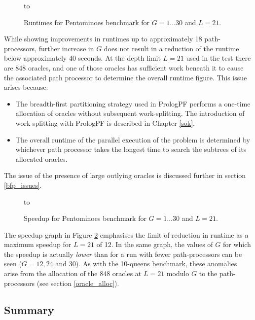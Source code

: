 \begin{figure}[htb]
\vspace{5mm} \hbox to 
\caption{Runtimes for Pentominoes benchmark for $G=1\ldots 30$ and $L=21$.}
\vspace{5mm}
\label{pentbook_cut_c_L_21}
\end{figure}

While showing improvements in runtimes up to approximately 18
path-processors, further increase in $G$ does not result in a
reduction of the runtime below approximately 40 seconds.  At the depth
limit $L=21$ used in the test there are 848 oracles, and one of those
oracles has sufficient work beneath it to cause the associated path
processor to determine the overall runtime figure.  This issue arises
because:
\begin{itemize}
\item{The breadth-first partitioning strategy used in PrologPF
  performs a one-time allocation of oracles without subsequent
  work-splitting.  The introduction of work-splitting with PrologPF
  is described in Chapter \ref{sok}.}
\item{The overall runtime of the parallel execution of the problem is determined by
  whichever path processor takes the longest time to search the subtrees of its
  allocated oracles.}
\end{itemize}
The issue of the presence of large outlying oracles
is discussed further in section \ref{bfp_issues}.

\begin{figure}[htb]
\vspace{5mm} \hbox to 
\caption{Speedup for Pentominoes benchmark for $G=1\ldots 30$ and $L=21$.}
\vspace{5mm}
\label{pent_cut_c_L_21_spdup}
\end{figure}

The speedup graph in Figure \ref{pent_cut_c_L_21_spdup} emphasises the limit of reduction
in runtime as a maximum speedup for $L=21$ of 12.  In the same graph, the values of $G$
for which the speedup is actually \textit{lower} than for a run with fewer path-processors
can be seen ($G=12,24 \mbox{ and } 30$).  As with the 10-queens benchmark, these anomalies
arise from the allocation of the 848 oracles at $L=21$ modulo $G$ to the path-processors
(see section \ref{oracle_alloc}).

\subsection{Summary}

